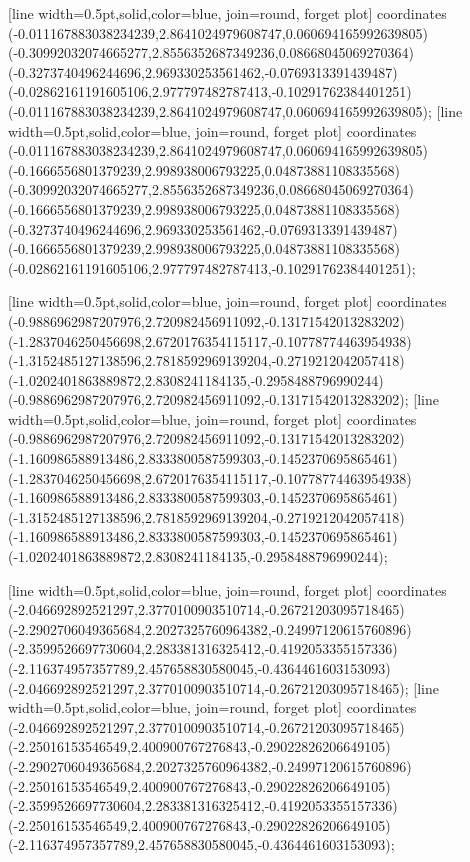 [line width=0.5pt,solid,color=blue, join=round, forget plot] coordinates {(-0.011167883038234239,2.8641024979608747,0.060694165992639805) (-0.30992032074665277,2.8556352687349236,0.08668045069270364) (-0.3273740496244696,2.969330253561462,-0.0769313391439487) (-0.02862161191605106,2.977797482787413,-0.10291762384401251) (-0.011167883038234239,2.8641024979608747,0.060694165992639805)};
[line width=0.5pt,solid,color=blue, join=round, forget plot] coordinates {(-0.011167883038234239,2.8641024979608747,0.060694165992639805) (-0.1666556801379239,2.998938006793225,0.04873881108335568) (-0.30992032074665277,2.8556352687349236,0.08668045069270364) (-0.1666556801379239,2.998938006793225,0.04873881108335568) (-0.3273740496244696,2.969330253561462,-0.0769313391439487) (-0.1666556801379239,2.998938006793225,0.04873881108335568) (-0.02862161191605106,2.977797482787413,-0.10291762384401251)};

[line width=0.5pt,solid,color=blue, join=round, forget plot] coordinates {(-0.9886962987207976,2.720982456911092,-0.13171542013283202) (-1.2837046250456698,2.6720176354115117,-0.10778774463954938) (-1.3152485127138596,2.7818592969139204,-0.2719212042057418) (-1.0202401863889872,2.8308241184135,-0.2958488796990244) (-0.9886962987207976,2.720982456911092,-0.13171542013283202)};
[line width=0.5pt,solid,color=blue, join=round, forget plot] coordinates {(-0.9886962987207976,2.720982456911092,-0.13171542013283202) (-1.160986588913486,2.8333800587599303,-0.1452370695865461) (-1.2837046250456698,2.6720176354115117,-0.10778774463954938) (-1.160986588913486,2.8333800587599303,-0.1452370695865461) (-1.3152485127138596,2.7818592969139204,-0.2719212042057418) (-1.160986588913486,2.8333800587599303,-0.1452370695865461) (-1.0202401863889872,2.8308241184135,-0.2958488796990244)};

[line width=0.5pt,solid,color=blue, join=round, forget plot] coordinates {(-2.046692892521297,2.3770100903510714,-0.26721203095718465) (-2.2902706049365684,2.2027325760964382,-0.24997120615760896) (-2.3599526697730604,2.283381316325412,-0.4192053355157336) (-2.116374957357789,2.457658830580045,-0.4364461603153093) (-2.046692892521297,2.3770100903510714,-0.26721203095718465)};
[line width=0.5pt,solid,color=blue, join=round, forget plot] coordinates {(-2.046692892521297,2.3770100903510714,-0.26721203095718465) (-2.25016153546549,2.400900767276843,-0.29022826206649105) (-2.2902706049365684,2.2027325760964382,-0.24997120615760896) (-2.25016153546549,2.400900767276843,-0.29022826206649105) (-2.3599526697730604,2.283381316325412,-0.4192053355157336) (-2.25016153546549,2.400900767276843,-0.29022826206649105) (-2.116374957357789,2.457658830580045,-0.4364461603153093)};

